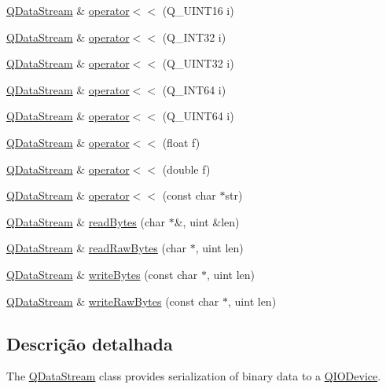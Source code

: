 \begin{DoxyCompactItemize}
\item 
\hyperlink{class_q_data_stream}{Q\-Data\-Stream} \& \hyperlink{class_q_data_stream_a9f155659247856fc65e54ba7e4a1293b}{operator$<$$<$} (Q\-\_\-\-U\-I\-N\-T16 i)
\item 
\hyperlink{class_q_data_stream}{Q\-Data\-Stream} \& \hyperlink{class_q_data_stream_a3c268f6da624a7e70b47e23c7c45599f}{operator$<$$<$} (Q\-\_\-\-I\-N\-T32 i)
\item 
\hyperlink{class_q_data_stream}{Q\-Data\-Stream} \& \hyperlink{class_q_data_stream_a7665db836b2ca2e78c8f2e5bfdbb5416}{operator$<$$<$} (Q\-\_\-\-U\-I\-N\-T32 i)
\item 
\hyperlink{class_q_data_stream}{Q\-Data\-Stream} \& \hyperlink{class_q_data_stream_afe970586040db7d5b8fada0aab01ad44}{operator$<$$<$} (Q\-\_\-\-I\-N\-T64 i)
\item 
\hyperlink{class_q_data_stream}{Q\-Data\-Stream} \& \hyperlink{class_q_data_stream_a6745eca11ccf5e8bf0ae45c46b8bd53f}{operator$<$$<$} (Q\-\_\-\-U\-I\-N\-T64 i)
\item 
\hyperlink{class_q_data_stream}{Q\-Data\-Stream} \& \hyperlink{class_q_data_stream_ace55e15063ffd570c3fefa496004a92b}{operator$<$$<$} (float f)
\item 
\hyperlink{class_q_data_stream}{Q\-Data\-Stream} \& \hyperlink{class_q_data_stream_a37f7b2c773dce5f323307810635e2509}{operator$<$$<$} (double f)
\item 
\hyperlink{class_q_data_stream}{Q\-Data\-Stream} \& \hyperlink{class_q_data_stream_a3d825aede8e30bcfad1a6b0e292d081b}{operator$<$$<$} (const char $\ast$str)
\item 
\hyperlink{class_q_data_stream}{Q\-Data\-Stream} \& \hyperlink{class_q_data_stream_a87443ae226d3d7acbf2a0bcf6cd2756f}{read\-Bytes} (char $\ast$\&, uint \&len)
\item 
\hyperlink{class_q_data_stream}{Q\-Data\-Stream} \& \hyperlink{class_q_data_stream_a85549d56b50b92d4d67b879f6b0a33d8}{read\-Raw\-Bytes} (char $\ast$, uint len)
\item 
\hyperlink{class_q_data_stream}{Q\-Data\-Stream} \& \hyperlink{class_q_data_stream_a0a858269202c641fccb177800cde17da}{write\-Bytes} (const char $\ast$, uint len)
\item 
\hyperlink{class_q_data_stream}{Q\-Data\-Stream} \& \hyperlink{class_q_data_stream_a0fc63368a2c7f81540020dfa5227497d}{write\-Raw\-Bytes} (const char $\ast$, uint len)
\end{DoxyCompactItemize}


\subsection{Descrição detalhada}
The \hyperlink{class_q_data_stream}{Q\-Data\-Stream} class provides serialization of binary data to a \hyperlink{class_q_i_o_device}{Q\-I\-O\-Device}. 

